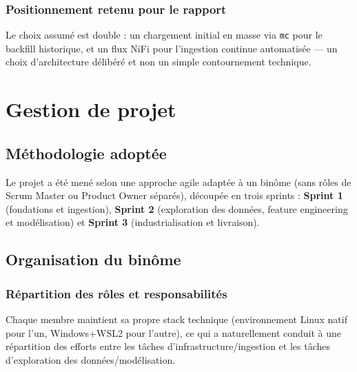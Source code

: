 \documentclass[11pt,a4paper]{report}
\begin{document}


\subsection{Positionnement retenu pour le rapport}
Le choix assumé est double : un chargement initial en masse via
\texttt{mc} pour le backfill historique, et un flux NiFi pour l'ingestion
continue automatisée — un choix d'architecture délibéré et non un simple
contournement technique.


\chapter{Gestion de projet}
\statutFait

\section{Méthodologie adoptée}
Le projet a été mené selon une approche agile adaptée à un binôme (sans
rôles de Scrum Master ou Product Owner séparés), découpée en trois sprints :
\textbf{Sprint 1} (fondations et ingestion), \textbf{Sprint 2} (exploration
des données, feature engineering et modélisation) et \textbf{Sprint 3}
(industrialisation et livraison).

\section{Organisation du binôme}

\subsection{Répartition des rôles et responsabilités}
Chaque membre maintient sa propre stack technique (environnement Linux
natif pour l'un, Windows+WSL2 pour l'autre), ce qui a naturellement conduit
à une répartition des efforts entre les tâches d'infrastructure/ingestion
et les tâches d'exploration des données/modélisation.
\end{document}
